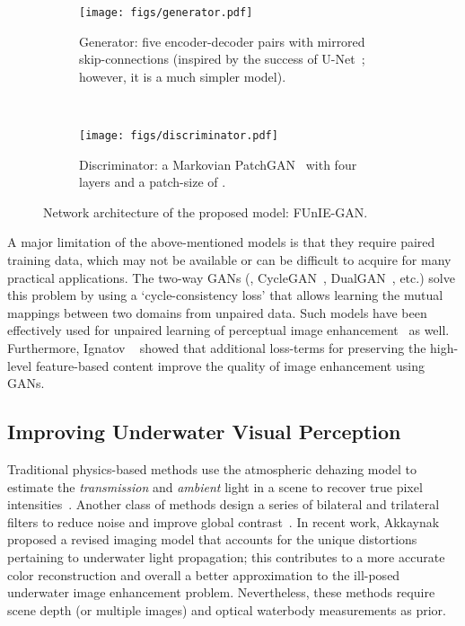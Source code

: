 \documentclass[10pt,twocolumn,letterpaper]{article}
\begin{document}
\begin{figure*}[t]
    \centering
    \begin{subfigure}{0.62\textwidth}
        \texttt{[image: figs/generator.pdf]}
        \caption{Generator: five encoder-decoder pairs with mirrored skip-connections (inspired by the success of U-Net~\cite{ronneberger2015u}; however, it is a much simpler model).}
        \label{fig:model_a}
    \end{subfigure}
    ~
    \begin{subfigure}{0.36\textwidth}
        \texttt{[image: figs/discriminator.pdf]}
        \caption{Discriminator: a Markovian PatchGAN~\cite{isola2017image} with four layers and a patch-size of .}
        \label{fig:model_b}
    \end{subfigure}
    \caption{Network architecture of the proposed model: FUnIE-GAN.}
    \label{fig:model}
\end{figure*}


A major limitation of the above-mentioned models is that they require paired training data, which may not be available or can be difficult to acquire for many practical applications. The two-way GANs (\eg, CycleGAN~\cite{zhu2017unpaired}, DualGAN~\cite{yi2017dualgan}, etc.) solve this problem by using a `cycle-consistency loss' that allows learning the mutual mappings between two domains from unpaired data. Such models have been effectively used for unpaired learning of perceptual image enhancement~\cite{chen2018deep} as well. Furthermore, Ignatov \etal~\cite{ignatov2017dslr} showed that additional loss-terms for preserving the high-level feature-based content improve the quality of image enhancement using GANs. 


\subsection{Improving Underwater Visual Perception}
Traditional physics-based methods use the atmospheric dehazing model to estimate the \textit{transmission} and \textit{ambient} light in a scene to recover true pixel intensities~\cite{cho2018model,bryson2016true}. 
Another class of methods design a series of bilateral and trilateral filters to reduce noise and improve global contrast~\cite{lu2013underwater,zhang2017underwater}. In recent work, Akkaynak\etal~\cite{akkaynak2018revised} proposed a revised imaging model that accounts for the unique distortions pertaining to underwater light propagation; this contributes to a more accurate color reconstruction and overall a better approximation to the ill-posed underwater image enhancement problem. Nevertheless, these methods require scene depth (or multiple images) and optical waterbody measurements as prior.  
\end{document}
